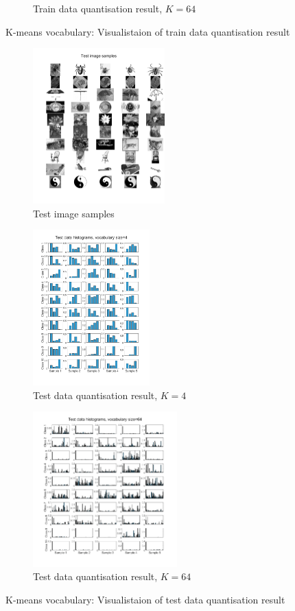\begin{figure}[htbp]
\begin{subfigure}[t]{0.3\linewidth}
		\caption{Train data quantisation result, $K=64$}
	\end{subfigure}
	\caption{K-means vocabulary: Visualistaion of train data quantisation result}
	\label{fig:q1_histogram_tr}
\end{figure}

\begin{figure}[htbp]
	\centering
	\begin{subfigure}[t]{0.3\linewidth}
		\centering
		\includegraphics[height=6cm]{image/q1-appendix/test_img.png} 
		\caption{Test image samples}
	\end{subfigure}%
	\hfill
	\begin{subfigure}[t]{0.3\linewidth}
		\centering
		\includegraphics[height=6cm]{image/q1-appendix/test_4.png}
		\caption{Test data quantisation result, $K=4$}
	\end{subfigure}
	\hfill
	\begin{subfigure}[t]{0.3\linewidth}
		\centering
		\includegraphics[height=6cm]{image/q1-appendix/test_64.png}
		\caption{Test data quantisation result, $K=64$}
	\end{subfigure}
	\caption{K-means vocabulary: Visualistaion of test data quantisation result}
	\label{fig:q1_histogram_te}
\end{figure}

